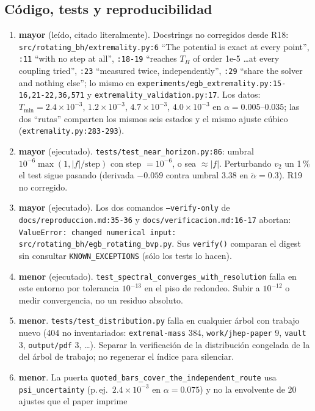 \documentclass[10pt,a4paper]{article}
\newcommand{\MAY}{\textcolor{may}{\textbf{mayor}}}
\newcommand{\MEN}{\textbf{menor}}
\newcommand{\code}[1]{\texttt{#1}}
\begin{document}
\subsection{Código, tests y reproducibilidad}
\label{sec:code}

\begin{enumerate}[label=C\arabic*.,leftmargin=2.4em]
\item \MAY{} (leído, citado literalmente). Docstrings no corregidos desde R18:
 \code{src/rotating\_bh/extremality.py:6} ``The potential is exact at every point'', \code{:11}
 ``with no step at all'', \code{:18-19} ``reaches $T_H$ of order 1e-5 \ldots at every coupling
 tried'', \code{:23} ``measured twice, independently'', \code{:29} ``share the solver and nothing
 else''; lo mismo en \code{experiments/egb\_extremality.py:15-16,21-22,36,571} y
 \code{extremality\_validation.py:17}. Los datos: $T_{\min}=2.4\times10^{-3}$, $1.2\times10^{-3}$,
 $4.7\times10^{-3}$, $4.0\times10^{-3}$ en $\alpha=0.005$--$0.035$; las dos ``rutas'' comparten
 los mismos seis estados y el mismo ajuste cúbico (\code{extremality.py:283-293}).
\item \MAY{} (ejecutado). \code{tests/test\_near\_horizon.py:86}: umbral
 $10^{-6}\max(1,|f|/\text{step})$ con step $=10^{-6}$, o sea $\approx|f|$. Perturbando $v_2$ un 1\,\%
 el test sigue pasando (derivada $-0.059$ contra umbral $3.38$ en $\tilde\alpha=0.3$). R19 no
 corregido.
\item \MAY{} (ejecutado). Los dos comandos \code{--verify-only} de \code{docs/reproduccion.md:35-36}
 y \code{docs/verificacion.md:16-17} abortan: \code{ValueError: changed numerical input:
 src/rotating\_bh/egb\_rotating\_bvp.py}. Sus \code{verify()} comparan el digest sin consultar
 \code{KNOWN\_EXCEPTIONS} (sólo los tests lo hacen).
\item \MEN{} (ejecutado). \code{test\_spectral\_converges\_with\_resolution} falla en este
 entorno por tolerancia $10^{-13}$ en el piso de redondeo. Subir a $10^{-12}$ o medir
 convergencia, no un residuo absoluto.
\item \MEN. \code{tests/test\_distribution.py} falla en cualquier árbol con trabajo nuevo (404 no
 inventariados: \code{extremal-mass} 384, \code{work/jhep-paper} 9, \code{vault} 3,
 \code{output/pdf} 3, \ldots). Separar la verificación de la distribución congelada de la del árbol
 de trabajo; no regenerar el índice para silenciar.
\item \MEN. La puerta \code{quoted\_bars\_cover\_the\_independent\_route} usa \code{psi\_uncertainty}
 (p.\,ej.\ $2.4\times10^{-3}$ en $\alpha=0.075$) y no la envolvente de 20 ajustes que el paper imprime

\end{enumerate}
\end{document}
